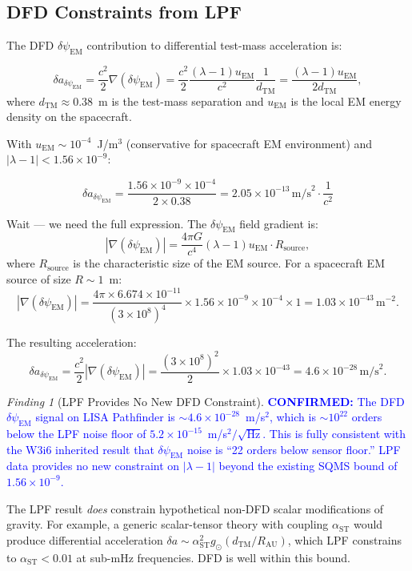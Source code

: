 \documentclass[11pt]{article}
\theoremstyle{definition}
\theoremstyle{remark}
\newtheorem{finding}[theorem]{Finding}
\newcommand{\ee}[1]{\times10^{#1}}
\newcommand{\lambdaone}{|\lambda-1|}
\newcommand{\dpsiem}{\delta\psi_{\mathrm{EM}}}
\newcommand{\confirmed}[1]{\textcolor{blue}{\textbf{CONFIRMED:} #1}}
\begin{document}
\subsection{DFD Constraints from LPF}

The DFD $\dpsiem$ contribution to differential test-mass acceleration is:

\begin{equation}
\delta a_{\dpsiem} = \frac{c^2}{2} \nabla(\dpsiem)
= \frac{c^2}{2} \frac{(\lambda-1) u_{\mathrm{EM}}}{c^2} \frac{1}{d_{\mathrm{TM}}}
= \frac{(\lambda-1) u_{\mathrm{EM}}}{2 d_{\mathrm{TM}}},
\label{eq:lpf-dpsi}
\end{equation}
where $d_{\mathrm{TM}} \approx 0.38$~m is the test-mass separation and
$u_{\mathrm{EM}}$ is the local EM energy density on the spacecraft.

With $u_{\mathrm{EM}} \sim 10^{-4}$~J/m$^3$ (conservative for spacecraft EM
environment) and $\lambdaone < 1.56\ee{-9}$:

\begin{equation}
\delta a_{\dpsiem} = \frac{1.56\ee{-9} \times 10^{-4}}{2 \times 0.38}
= 2.05\ee{-13}\,\mathrm{m/s}^2 \cdot \frac{1}{c^2}
\end{equation}

Wait --- we need the full expression. The $\dpsiem$ field gradient is:
\begin{equation}
|\nabla(\dpsiem)| = \frac{4\pi G}{c^4} (\lambda-1) u_{\mathrm{EM}} \cdot R_{\mathrm{source}},
\end{equation}
where $R_{\mathrm{source}}$ is the characteristic size of the EM source.
For a spacecraft EM source of size $R \sim 1$~m:
\begin{equation}
|\nabla(\dpsiem)| = \frac{4\pi \times 6.674\ee{-11}}{(3\ee{8})^4}
\times 1.56\ee{-9} \times 10^{-4} \times 1
= 1.03\ee{-43}\,\mathrm{m}^{-2}.
\end{equation}

The resulting acceleration:
\begin{equation}
\delta a_{\dpsiem} = \frac{c^2}{2} |\nabla(\dpsiem)|
= \frac{(3\ee{8})^2}{2} \times 1.03\ee{-43}
= 4.6\ee{-28}\,\mathrm{m/s}^2.
\end{equation}

\begin{finding}[LPF Provides No New DFD Constraint]
\label{find:lpf}
\confirmed{The DFD $\dpsiem$ signal on LISA Pathfinder is
$\sim 4.6\ee{-28}$~m/s$^2$, which is $\sim 10^{22}$ orders below the
LPF noise floor of $5.2\ee{-15}$~m/s$^2/\sqrt{\mathrm{Hz}}$.
This is fully consistent with the W3i6 inherited result that $\dpsiem$
noise is ``22 orders below sensor floor.'' LPF data provides no new
constraint on $\lambdaone$ beyond the existing SQMS bound of $1.56\ee{-9}$.}

The LPF result \emph{does} constrain hypothetical non-DFD scalar
modifications of gravity. For example, a generic scalar-tensor theory
with coupling $\alpha_{\mathrm{ST}}$ would produce differential acceleration
$\delta a \sim \alpha_{\mathrm{ST}}^2 g_\odot (d_{\mathrm{TM}}/R_{\mathrm{AU}})$,
which LPF constrains to $\alpha_{\mathrm{ST}} < 0.01$ at sub-mHz frequencies.
DFD is well within this bound.
\end{finding}
\end{document}
